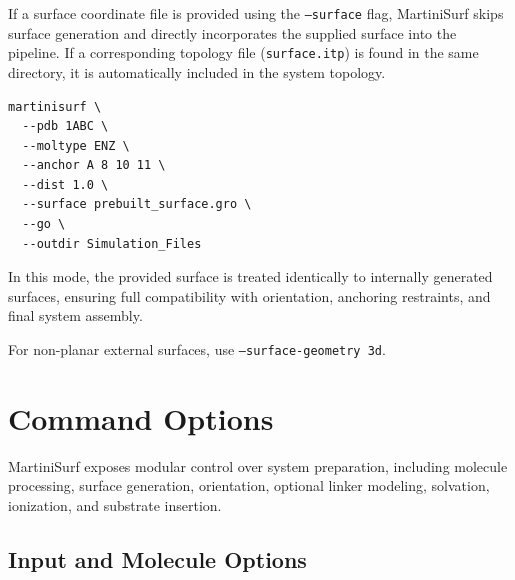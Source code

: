 \documentclass[11pt]{article}
\begin{document}
If a surface coordinate file is provided using the \texttt{--surface} flag,
MartiniSurf skips surface generation and directly incorporates the supplied surface
into the pipeline. If a corresponding topology file (\texttt{surface.itp}) is found
in the same directory, it is automatically included in the system topology.

\begin{lstlisting}
martinisurf \
  --pdb 1ABC \
  --moltype ENZ \
  --anchor A 8 10 11 \
  --dist 1.0 \
  --surface prebuilt_surface.gro \
  --go \
  --outdir Simulation_Files
\end{lstlisting}

In this mode, the provided surface is treated identically to internally generated
surfaces, ensuring full compatibility with orientation, anchoring restraints,
and final system assembly.

For non-planar external surfaces, use \texttt{--surface-geometry 3d}.

\section{Command Options}

MartiniSurf exposes modular control over system preparation,
including molecule processing, surface generation, orientation,
optional linker modeling, solvation, ionization, and substrate insertion.

\subsection{Input and Molecule Options}
\end{document}
